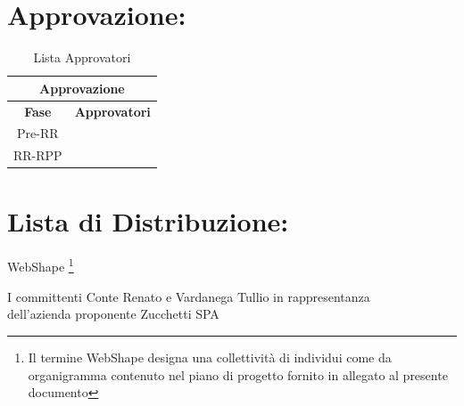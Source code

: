 \section*{\LARGE Approvazione:}
\begin{table}[!h]
	\begin{center}
		\begin{tabular}
			{|c|c|}
			\hline
			\multicolumn{2}{|c|}{ \textbf{Approvazione} } \\
			\hline
			\textbf{Fase} & \textbf{Approvatori} \\
			\hline
			\multirow{2}{*}{Pre-RR} &  \\
									&  \\
			\hline
			\multirow{2}{*}{RR-RPP} & \\
									& \\
			\hline
		\end{tabular}
		\caption{Lista Approvatori} %
		\label{tabapprovazione}
	\end{center}
\end{table}
\textbf{}

\section*{\LARGE Lista di Distribuzione:}

	\begin{elenconumerato}{\normindent}
		\item WebShape \footnote{Il termine WebShape designa una collettivit\`a di individui come da organigramma contenuto nel piano di progetto fornito in allegato al presente documento}
		\item I committenti Conte Renato e Vardanega Tullio in rappresentanza \\  dell'azienda proponente Zucchetti SPA
	\end{elenconumerato}

